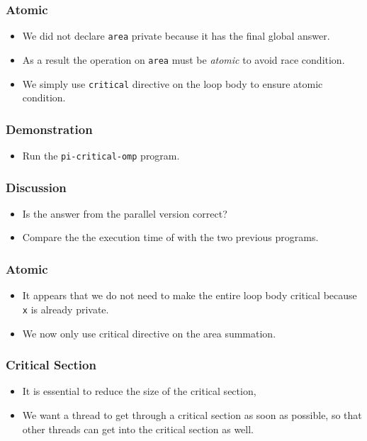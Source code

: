 \documentclass{beamer}
\begin{document}
\begin{frame}
  \frametitle{Atomic} 
  \begin{itemize}
  \item We did not declare {\tt area} private because it has the final
    global answer.
  \item As a result the operation on {\tt area} must be {\em atomic}
    to avoid race condition.
  \item We simply use {\tt critical} directive on the loop body to
    ensure atomic condition.
  \end{itemize}
\end{frame}

\begin{frame}
\end{frame}

\begin{frame}
  \frametitle{Demonstration}
  \begin{itemize}
  \item Run the {\tt pi-critical-omp} program.
  \end{itemize}
\end{frame}

\begin{frame}
  \frametitle{Discussion}
  \begin{itemize}
  \item Is the answer from the parallel version correct? 
  \item Compare the the execution time of with the two previous
    programs.
  \end{itemize}
\end{frame}

\begin{frame}
  \frametitle{Atomic} 
  \begin{itemize}
  \item It appears that we do not need to make the entire loop body
    critical because {\tt x} is already private.
  \item We now only use critical directive on the area summation.
  \end{itemize}
\end{frame}

\begin{frame}
  \frametitle{Critical Section}
  \begin{itemize}
  \item It is essential to reduce the size of the critical section,
  \item We want a thread to get through a critical section as soon as
    possible, so that other threads can get into the critical section
    as well.
\end{itemize}
\end{frame}
\end{document}
